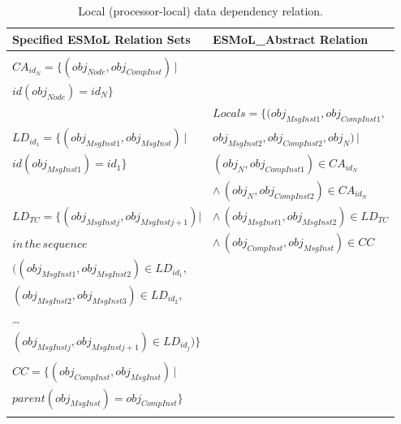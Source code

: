 \begin{table}
\centering

\begin{tabular}[width=0.5\columnwidth]{ | l | l | }
 \hline
 \textbf{Specified ESMoL Relation Sets} & \textbf{ESMoL\_Abstract Relation} \\
 \hline \hline
                                                                        & \\
 $CA_{id_N} = \{ (obj_{Node}, obj_{CompInst} ) \, |$                    & \\
 \hspace{1.7cm} $ id(obj_{Node}) = id_N \} $                            & \\
                                                                        & 
$ Locals = \{(obj_{MsgInst1}, obj_{CompInst1}, $  \\
 $LD_{id_1} = \{ (obj_{MsgInst1}, obj_{MsgInst} ) \, |$             & 
\hspace{0.7cm} $obj_{MsgInst2}, obj_{CompInst2}, obj_{N}) \, |$ \\
 \hspace{1.9cm} $id(obj_{MsgInst1}) = id_1 \} $                & 
\hspace{0.5cm} $(obj_{N}, obj_{CompInst1}) \in CA_{id_N}$ \\
                                                                        &  
\hspace{0.2cm} $\wedge \, (obj_{N}, obj_{CompInst2}) \in CA_{id_N}$ \\
 $LD_{TC} = \{ (obj_{MsgInstj}, obj_{MsgInstj+1}) |  $ & 
\hspace{0.2cm} $ \wedge \, (obj_{MsgInst1}, obj_{MsgInst2}) \in LD_{TC}$
\\
 \hspace{0.3cm} $ in \, the \, sequence  $ &
\hspace{0.15cm} $ \wedge \, (obj_{CompInst}, obj_{MsgInst}) \in CC $ \\
 \hspace{0.4cm} $  ( (obj_{MsgInst1}, obj_{MsgInst2}) \in LD_{id_1}, $ &
\\
 \hspace{0.4cm} $ (obj_{MsgInst2}, obj_{MsgInst3}) \in LD_{id_2}, $ & \\
 \hspace{0.7cm} \dots & \\
 \hspace{0.4cm} $ (obj_{MsgInstj}, obj_{MsgInstj+1}) \in LD_{id_j} ) \} $
& \\
 & \\
 $CC = \{ (obj_{CompInst}, obj_{MsgInst} ) \, | $  & \\
 \hspace{0.3cm} $parent(obj_{MsgInst} ) = obj_{CompInst} \}$ & \\
 & \\
 \hline
\end{tabular}
	\caption{Local (processor-local) data dependency relation.}
	\label{tab:localdeps}
\end{table}

